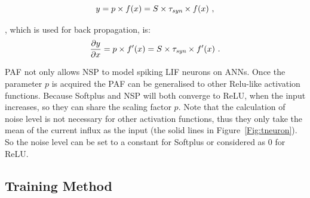 \DIFdelend \begin{equation}
	y = p \times f(x) = S \times \tau_{\textit{\textrm{syn}}} \times f(x)~,
	\label{equ:PAF}
	\end{equation}
	\DIFdelbegin {}\DIFdelend \DIFaddbegin {}

	
	\DIFaddend , which is used for back propagation, is:
	\begin{equation}
	\frac{\partial y}{\partial x} = p \times f'(x) = S \times \tau_{\textit{\textrm{syn}}} \times f'(x)~.
	\end{equation}

	\DIFdelbegin {}\DIFdelend PAF not only allows NSP to model spiking LIF neurons on ANNs.
	Once the parameter $p$ is acquired the PAF can be generalised to other Relu-like activation functions.
	Because Softplus and NSP will both converge to ReLU, when the input increases, so they can share the scaling factor $p$.
	Note that the calculation of noise level is not necessary for other activation functions, thus they only take the mean of the current influx as the input (the solid lines in Figure~\ref{Fig:tneuron}).
	So the noise level can be set to a constant for Softplus or considered as 0 for ReLU.

	\subsection{Training Method}
	\label{subsec:ns_train}

